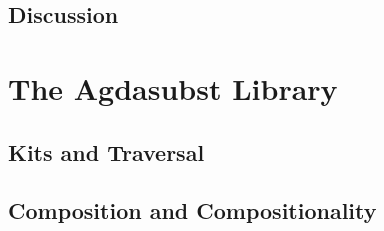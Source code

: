 \documentclass[screen,nonacm]{acmart}
\begin{document}
\subsection{}

\subsection{Discussion}\label{sec:rsn-dis}

\section{The Agdasubst Library}\label{sec:ags}



\subsection{Kits and Traversal}\label{sec:ags-kit}


\subsection{Composition and Compositionality}\label{sec:ags-kit}

\end{document}
